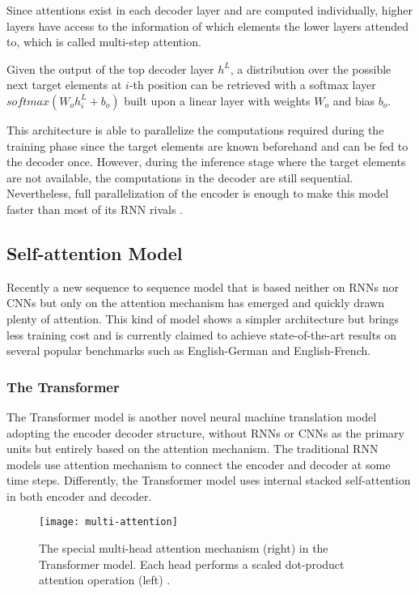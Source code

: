 Since attentions exist in each decoder layer and are computed individually, higher layers have access to the information of which elements the lower layers attended to, which is called multi-step attention. 

Given the output of the top decoder layer $ h^{L} $, a distribution over the possible next target elements at $ i $-th position can be retrieved with a softmax layer $ softmax(W_{o}h_{i}^{L}+b_{o}) $ built upon a linear layer with weights $ W_{o} $ and bias $ b_{o} $. 

This architecture is able to parallelize the computations required during the training phase since the target elements are known beforehand and can be fed to the decoder once. However, during the inference stage where the target elements are not available, the computations in the decoder are still sequential. Nevertheless, full parallelization of the encoder is enough to make this model faster than most of its RNN rivals \cite{gehring2017convs2s}.

\subsection{Self-attention Model}

Recently a new sequence to sequence model that is based neither on RNNs nor CNNs but only on the attention mechanism has emerged and quickly drawn plenty of attention. This kind of model shows a simpler architecture but brings less training cost and is currently claimed to achieve state-of-the-art results on several popular benchmarks such as  English-German and English-French.

\subsubsection*{The Transformer}

The Transformer model \cite{Vaswani2017} is another novel neural machine translation model adopting the encoder decoder structure, without RNNs or CNNs as the primary units but entirely based on the attention mechanism. The traditional RNN models use attention mechanism to connect the encoder and decoder at some time steps. Differently, the Transformer model uses internal stacked self-attention in both encoder and decoder.

\begin{figure}[h]
\texttt{[image: multi-attention]}
\centering
\caption{The special multi-head attention mechanism (right) in the Transformer model. Each head performs a scaled dot-product attention operation (left) \cite{Vaswani2017}.}
\label{figure:scaled dot-product attention}
\end{figure}

